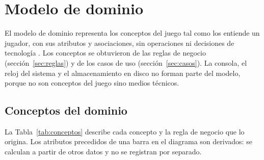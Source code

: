 \section{Modelo de dominio}\label{sec:dominio}

El modelo de dominio representa los conceptos del juego tal como los entiende un jugador, con sus atributos y asociaciones, sin operaciones ni decisiones de tecnología . Los conceptos se obtuvieron de las reglas de negocio (sección~\ref{sec:reglas}) y de los casos de uso (sección~\ref{sec:casos}). La consola, el reloj del sistema y el almacenamiento en disco no forman parte del modelo, porque no son conceptos del juego sino medios técnicos.


\subsection{Conceptos del dominio}

La Tabla~\ref{tab:conceptos} describe cada concepto y la regla de negocio que lo origina. Los atributos precedidos de una barra en el diagrama son derivados: se calculan a partir de otros datos y no se registran por separado.

